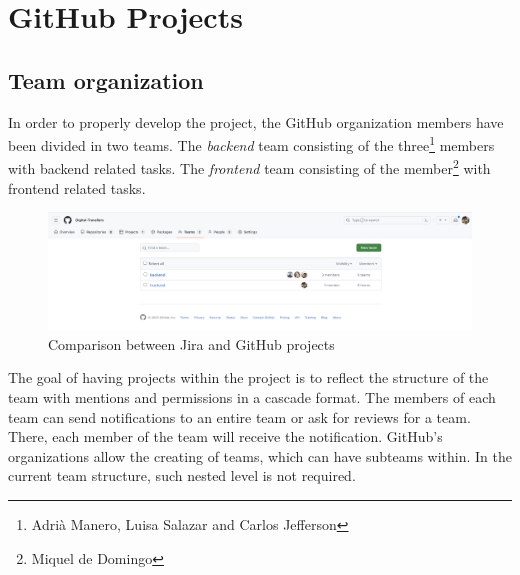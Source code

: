 \documentclass[../memory.tex]{subfiles}
\begin{document}
\section{GitHub Projects}
\subsection{Team organization}
In order to properly develop the project, the GitHub organization members have
been divided in two teams. The \emph{backend} team consisting of the
three\footnote{Adrià Manero, Luisa Salazar and Carlos Jefferson} members with
backend related tasks. The \emph{frontend} team consisting of the
member\footnote{Miquel de Domingo} with frontend related tasks.
\begin{figure}[H]
	\centering
	\includegraphics[width=\textwidth]{./assets/gh-teams.png}
	\caption{Comparison between Jira and GitHub projects}
\end{figure}
The goal of having projects within the project is to reflect the structure of
the team with mentions and permissions in a cascade format. The members of each
team can send notifications to an entire team or ask for reviews for a team.
There, each member of the team will receive the notification. GitHub's
organizations allow the creating of teams, which can have subteams within. In
the current team structure, such nested level is not required.
\end{document}
